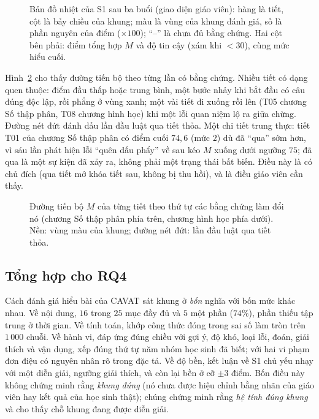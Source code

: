 \begin{figure}[tp]
\centering

\caption{Bản đồ nhiệt của S1 sau ba buổi (giao diện giáo viên): hàng là tiết, cột là bảy chiều của khung; màu là vùng của khung đánh giá, số là phần nguyên của điểm ($\times100$); ``--'' là chưa đủ bằng chứng. Hai cột bên phải: điểm tổng hợp $M$ và độ tin cậy (xám khi $<30$), cùng mức hiểu cuối.}
\label{fig:heat}
\end{figure}

Hình~\ref{fig:traj} cho thấy đường tiến bộ theo từng lần có bằng chứng. Nhiều tiết có dạng quen thuộc: điểm đầu thấp hoặc trung bình, một bước nhảy khi bắt đầu có câu đúng độc lập, rồi phẳng ở vùng xanh; một vài tiết đi xuống rồi lên (T05 chương Số thập phân, T08 chương hình học) khi một lỗi quan niệm lộ ra giữa chừng. Đường nét đứt đánh dấu lần đầu luật qua tiết thỏa. Một chi tiết trung thực: tiết T01 của chương Số thập phân có điểm cuối $74{,}6$ (mức $2$) dù đã ``qua'' sớm hơn, vì sáu lần phát hiện lỗi ``quên dấu phẩy'' về sau kéo $M$ xuống dưới ngưỡng $75$; đã qua là một sự kiện đã xảy ra, không phải một trạng thái bất biến. Điều này là có chủ đích (qua tiết mở khóa tiết sau, không bị thu hồi), và là điều giáo viên cần thấy.

\begin{figure}[tp]
\centering

\caption{Đường tiến bộ $M$ của từng tiết theo thứ tự các bằng chứng làm đổi nó (chương Số thập phân phía trên, chương hình học phía dưới). Nền: vùng màu của khung; đường nét đứt: lần đầu luật qua tiết thỏa.}
\label{fig:traj}
\end{figure}

\begin{table}[tp]
\centering
\caption{Trạng thái cuối của từng tiết với S1: $M$, độ tin cậy, mức hiểu ($0$--$5$), điểm trung bình các chiều có đủ bằng chứng, số thành công và các lỗi quan niệm đã phát hiện (số lần).}
\label{tab:nodes-s1}

\end{table}

\subsection{Tổng hợp cho RQ4}
Cách đánh giá hiểu bài của CAVAT sát khung ở \emph{bốn} nghĩa với bốn mức khác nhau. Về nội dung, $16$ trong $25$ mục đầy đủ và $5$ một phần ($74\%$), phần thiếu tập trung ở thời gian. Về tính toán, khớp công thức đóng trong sai số làm tròn trên $1\,000$ chuỗi. Về hành vi, đáp ứng đúng chiều với gợi ý, độ khó, loại lỗi, đoán, giải thích và vận dụng, xếp đúng thứ tự năm nhóm học sinh đã biết; với hai vi phạm đơn điệu có nguyên nhân rõ trong đặc tả. Về độ bền, kết luận về S1 chủ yếu nhạy với một diễn giải, ngưỡng giải thích, và còn lại bền ở cỡ $\pm3$ điểm. Bốn điều này không chứng minh rằng \emph{khung đúng} (nó chưa được hiệu chỉnh bằng nhãn của giáo viên hay kết quả của học sinh thật); chúng chứng minh rằng \emph{hệ tính đúng khung} và cho thấy chỗ khung đang được diễn giải.
